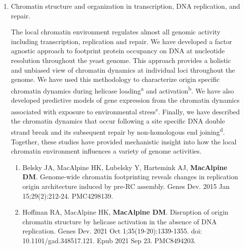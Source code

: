 \documentclass{nihbiosketch}
\begin{document}
\begin{enumerate}
\item Chromatin structure and organization in transcription, DNA replication, and repair.   

The local chromatin environment regulates almost all genomic activity including transcription, replication and repair.  We have developed a factor agnostic approach to footprint  protein occupancy on DNA at nucleotide resolution throughout the yeast genome.  This approach provides a holistic and unbiased view of chromatin dynamics at individual loci throughout the genome.  We have used this methodology to characterize origin specific chromatin dynamics during helicase loading\textsuperscript{a} and activation\textsuperscript{b}. We have also developed predictive models of gene expression from the chromatin dynamics associated with exposure to environmental stress\textsuperscript{c}. Finally, we have described the chromatin dynamics that occur following a site specific DNA double strand break and its subsequent repair by non-homologous end joining\textsuperscript{d}.  Together, these studies have provided mechanistic insight into how the local chromatin environment influences a variety of genome activities.  


\begin{enumerate}
\setlength\itemsep{0.35em}


\item Belsky JA, MacAlpine HK, Lubelsky Y, Hartemink AJ, \textbf{MacAlpine DM}. Genome-wide chromatin footprinting reveals changes in replication origin architecture induced by pre-RC assembly. Genes Dev. 2015 Jan 15;29(2):212-24. PMC4298139.

\item Hoffman RA, MacAlpine HK, \textbf{MacAlpine DM}. Disruption of origin chromatin structure by helicase activation in the absence of DNA replication. Genes Dev. 2021 Oct 1;35(19-20):1339-1355. doi: 10.1101/gad.348517.121. Epub 2021 Sep 23. PMC8494203.


\end{enumerate}
\end{enumerate}
\end{document}
